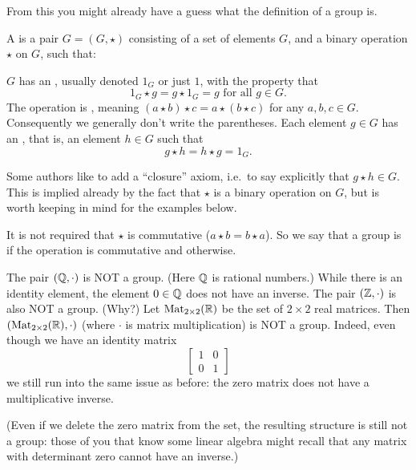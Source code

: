 From this you might already have a guess what the definition of a group is.
\begin{definition}
	A  is a pair $G = (G, \star)$
	consisting of a set of elements $G$, and a binary operation $\star$ on $G$, such that:
	\begin{itemize}
		\ii $G$ has an , usually denoted $1_G$
		or just $1$, with the property that
		\[ 1_G \star g = g \star 1_G = g \text{ for all $g \in G$}. \]
		\ii The operation is , meaning
		$(a \star b) \star c = a \star (b \star c)$
		for any $a,b,c \in G$.
		Consequently we generally don't write the parentheses.
		\ii Each element $g \in G$ has an , that is, an element $h \in G$ such that \[ g \star h = h \star g = 1_G. \]
	\end{itemize}
	\label{def:group}
\end{definition}
\begin{remark}
	Some authors like to add a ``closure'' axiom,
	i.e.\ to say explicitly that $g \star h \in G$.
	This is implied already by the fact that $\star$
	is a binary operation on $G$,
	but is worth keeping in mind for the examples below.
\end{remark}

\begin{remark}
	It is not required that $\star$ is commutative ($a \star b = b \star a$).
	So we say that a group is  if the operation is
	commutative and  otherwise.
\end{remark}


\begin{example}
	\listhack
	\begin{itemize}
		\ii The pair $(\mathbb Q, \cdot)$ is NOT a group.
		(Here $\mathbb Q$ is rational numbers.)
		While there is an identity element, the element $0 \in \mathbb Q$
		does not have an inverse.
		\ii The pair $(\mathbb Z, \cdot)$ is also NOT a group. (Why?)
		\ii Let $\mathrm{Mat}_{2 \times 2}(\mathbb R)$ be the set of $2 \times 2$ real matrices.
		Then $(\mathrm{Mat}_{2 \times 2}(\mathbb R), \cdot)$
		(where $\cdot$ is matrix multiplication) is NOT a group.
		Indeed, even though we have an identity matrix
		\[
			\begin{bmatrix}
				1 & 0 \\ 0 & 1
			\end{bmatrix}
		\]
		we still run into the same issue as before:
		the zero matrix does not have a multiplicative inverse.

		(Even if we delete the zero matrix from the set,
		the resulting structure is still not a group:
		those of you that know some linear algebra
		might recall that any matrix with determinant zero
		cannot have an inverse.)
	\end{itemize}
\end{example}

